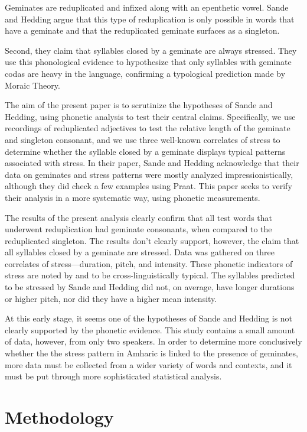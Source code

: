 \documentclass[12pt]{article}
\begin{document}
Geminates are reduplicated and infixed along with an epenthetic vowel. Sande and Hedding argue that this type of reduplication is only possible in words that have a geminate and that the reduplicated geminate surfaces as a singleton. 

Second, they claim that syllables closed by a geminate are always stressed. They use this phonological evidence to hypothesize that only syllables with geminate codas are heavy in the language, confirming a typological prediction made by Moraic Theory.

The aim of the present paper is to scrutinize the hypotheses of Sande and Hedding, using phonetic analysis to test their central claims. Specifically, we use recordings of reduplicated adjectives to test the relative length of the geminate and singleton consonant, and we use three well-known correlates of stress to determine whether the syllable closed by a geminate displays typical patterns associated with stress. In their paper, Sande and Hedding acknowledge that their data on geminates and stress patterns were mostly analyzed impressionistically, although they did check a few examples using Praat. This paper seeks to verify their analysis in a more systematic way, using phonetic measurements. 

The results of the present analysis clearly confirm that all test words that underwent reduplication had geminate consonants, when compared to the reduplicated singleton. The results don't clearly support, however, the claim that all syllables closed by a geminate are stressed. Data was gathered on three correlates of stress---duration, pitch, and intensity. These phonetic indicators of stress are noted by \cite{hayes} and \cite{fox} to be cross-linguistically typical. The syllables predicted to be stressed by Sande and Hedding did not, on average, have longer durations or higher pitch, nor did they have a higher mean intensity. 

At this early stage, it seems one of the hypotheses of Sande and Hedding is not clearly supported by the phonetic evidence. This study contains a small amount of data, however, from only two speakers. In order to determine more conclusively whether the the stress pattern in Amharic is linked to the presence of geminates, more data must be collected from a wider variety of words and contexts, and it must be put through more sophisticated statistical analysis.

\section{Methodology}
\end{document}
